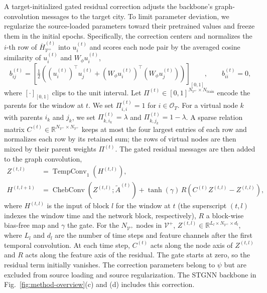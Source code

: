 \documentclass[runningheads,a4paper]{llncs}
\begin{document}
A target-initialized gated residual correction adjusts the backbone's graph-convolution messages to the target city. To limit parameter deviation, we regularize the source-loaded parameters toward their pretrained values and freeze them in the initial epochs. Specifically, the correction centers and normalizes the $i$-th row of $\overline H_{\mathcal V^{+}}^{(t)}$ into $u_i^{(t)}$ and scores each node pair by the averaged cosine similarity of $u_i^{(t)}$ and $W_\phi u_i^{(t)}$,
\begin{equation}
  b_{ij}^{(t)}=\left[\tfrac12\left((u_i^{(t)})^\top u_j^{(t)}+(W_\phi u_i^{(t)})^\top(W_\phi u_j^{(t)})\right)\right]_{[0,1]},
  \qquad b_{ii}^{(t)}=0 ,
  \label{eq:correction-scores}
\end{equation}
where $[\cdot]_{[0,1]}$ clips to the unit interval. Let $\Pi^{(t)}\in[0,1]^{N_{\mathcal V^{+}}\times N_{\mathrm{train}}}$ encode the parents for the window at $t$. We set $\Pi_{i,i}^{(t)}=1$ for $i\in\mathcal O_T$. For a virtual node $k$ with parents $i_k$ and $j_k$, we set $\Pi_{k,i_k}^{(t)}=\lambda$ and $\Pi_{k,j_k}^{(t)}=1-\lambda$. A sparse relation matrix $C^{(t)}\in\mathbb R^{N_{\mathcal V^{+}}\times N_{\mathcal V^{+}}}$ keeps at most the four largest entries of each row and normalizes each row by its retained sum; the rows of virtual nodes are then mixed by their parent weights $\Pi^{(t)}$. The gated residual messages are then added to the graph convolution,
\begin{equation}
\begin{aligned}
  Z^{(t,l)}&=\operatorname{TempConv}_1(H^{(t,l)}),\\
  H^{(t,l+1)}&=\operatorname{ChebConv}(Z^{(t,l)};\tilde A^{(t)})+\tanh(\gamma)\,R(C^{(t)}Z^{(t,l)}-Z^{(t,l)}),
\end{aligned}
  \label{eq:sparse-correction}
\end{equation}
where $H^{(t,l)}$ is the input of block $l$ for the window at $t$ (the superscript $(t,l)$ indexes the window time and the network block, respectively), $R$ a block-wise bias-free map and $\gamma$ the gate. For the $N_{\mathcal V^{+}}$ nodes in $\mathcal V^{+}$, $Z^{(t,l)}\in\mathbb R^{L_l\times N_{\mathcal V^{+}}\times d_l}$, where $L_l$ and $d_l$ are the number of time steps and feature channels after the first temporal convolution. At each time step, $C^{(t)}$ acts along the node axis of $Z^{(t,l)}$ and $R$ acts along the feature axis of the residual. The gate starts at zero, so the residual term initially vanishes. The correction parameters belong to $\psi$ but are excluded from source loading and source regularization. The STGNN backbone in Fig.~\ref{fig:method-overview}(c) and (d) includes this correction.
\end{document}
